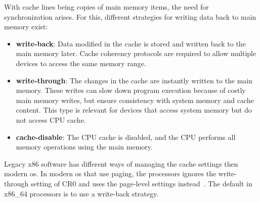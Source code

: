 
With cache lines being copies of main memory items, the need for synchronization
arises. For this, different strategies for writing data back to main memory
exist:
\begin{itemize}
  \item \textbf{write-back}: Data modified in the cache is stored and written
    back to the main memory later. Cache coherency protocols are required to
    allow multiple devices to access the same memory range.
  \item \textbf{write-through}: The changes in the cache are instantly written
    to the main memory. These writes can slow down program execution because of
    costly main memory writes, but ensure consistency with system memory and
    cache content. This type is relevant for devices that access system memory
    but do not access CPU cache.
  \item \textbf{cache-disable}: The CPU cache is disabled, and the CPU
    performs all memory operations using the main memory.
\end{itemize}

Legacy x86 software has different ways of managing the cache settings then
modern \gls{os}. In modern \gls{os} that use paging, the processors ignores the
write-through setting of CR0 and uses the page-level settings
instead~\cite{amd_manual}. The default in x86\_64 processors is to use a
write-back strategy.

